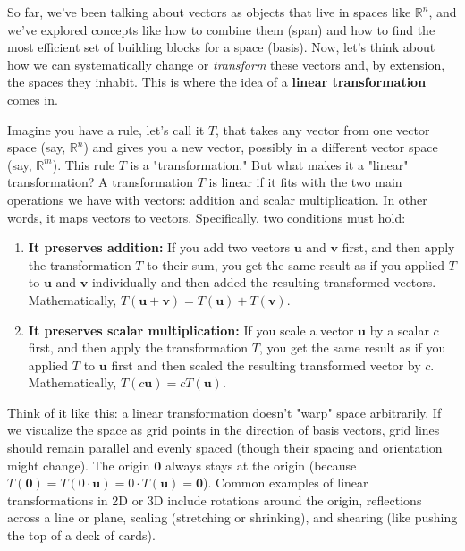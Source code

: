 \documentclass[11pt]{article}
\begin{document}
So far, we've been talking about vectors as objects that live in spaces like $\mathbb{R}^n$, and we've explored concepts like how to combine them (span) and how to find the most efficient set of building blocks for a space (basis). Now, let's think about how we can systematically change or \textit{transform} these vectors and, by extension, the spaces they inhabit. This is where the idea of a \textbf{linear transformation} comes in.

Imagine you have a rule, let's call it $T$, that takes any vector from one vector space (say, $\mathbb{R}^n$) and gives you a new vector, possibly in a different vector space (say, $\mathbb{R}^m$). This rule $T$ is a "transformation." But what makes it a "linear" transformation? A transformation $T$ is linear if it fits with the two main operations we have with vectors: addition and scalar multiplication. In other words, it maps vectors to vectors. Specifically, two conditions must hold:

\begin{enumerate}
    \item \textbf{It preserves addition:} If you add two vectors $\mathbf{u}$ and $\mathbf{v}$ first, and then apply the transformation $T$ to their sum, you get the same result as if you applied $T$ to $\mathbf{u}$ and $\mathbf{v}$ individually and then added the resulting transformed vectors. Mathematically, $T(\mathbf{u} + \mathbf{v}) = T(\mathbf{u}) + T(\mathbf{v})$.
    \item \textbf{It preserves scalar multiplication:} If you scale a vector $\mathbf{u}$ by a scalar $c$ first, and then apply the transformation $T$, you get the same result as if you applied $T$ to $\mathbf{u}$ first and then scaled the resulting transformed vector by $c$. Mathematically, $T(c\mathbf{u}) = cT(\mathbf{u})$.
\end{enumerate}

Think of it like this: a linear transformation doesn't "warp" space arbitrarily. If we visualize the space as grid points in the direction of basis vectors, grid lines should remain parallel and evenly spaced (though their spacing and orientation might change). The origin $\mathbf{0}$ always stays at the origin (because $T(\mathbf{0}) = T(0 \cdot \mathbf{u}) = 0 \cdot T(\mathbf{u}) = \mathbf{0}$). Common examples of linear transformations in 2D or 3D include rotations around the origin, reflections across a line or plane, scaling (stretching or shrinking), and shearing (like pushing the top of a deck of cards).
\end{document}
